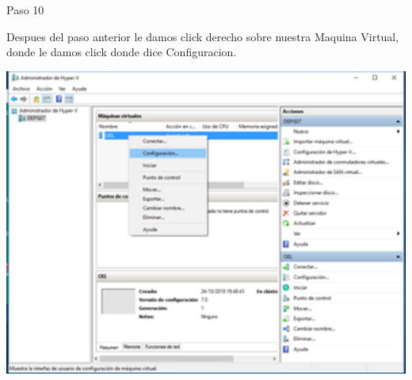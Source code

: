 \begin{itemize}
\begin{center}
    Paso 10
\end{center}


    Despues del paso anterior le damos click derecho sobre nuestra Maquina Virtual, donde le damos click donde dice Configuracion.\\
	\begin{center}
	\includegraphics[width=15cm]{./Imagenes/imagen10} 
	\end{center}

\end{itemize} 


  
  
  

